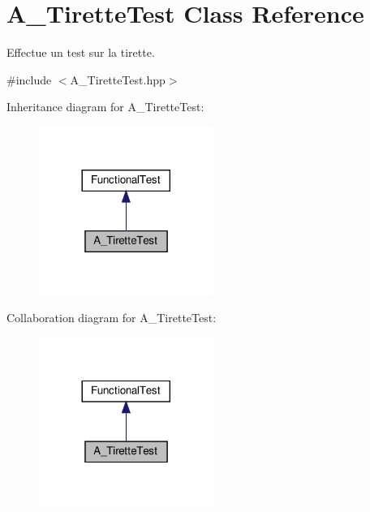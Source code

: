 \hypertarget{classA__TiretteTest}{}\section{A\+\_\+\+Tirette\+Test Class Reference}
\label{classA__TiretteTest}


Effectue un test sur la tirette.  




{\ttfamily \#include $<$A\+\_\+\+Tirette\+Test.\+hpp$>$}



Inheritance diagram for A\+\_\+\+Tirette\+Test\+:
\nopagebreak
\begin{figure}[H]
\begin{center}
\leavevmode
\includegraphics[width=161pt]{classA__TiretteTest__inherit__graph}
\end{center}
\end{figure}


Collaboration diagram for A\+\_\+\+Tirette\+Test\+:
\nopagebreak
\begin{figure}[H]
\begin{center}
\leavevmode
\includegraphics[width=161pt]{classA__TiretteTest__coll__graph}
\end{center}
\end{figure}
